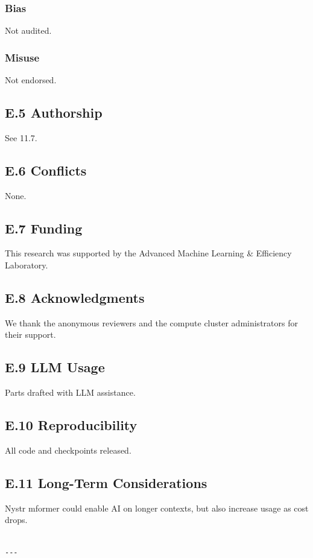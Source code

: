 \subsubsection{Bias}
Not audited.

\subsubsection{Misuse}
Not endorsed.

\subsection{E.5 Authorship}
See  11.7.

\subsection{E.6 Conflicts}
None.

\subsection{E.7 Funding}
This research was supported by the Advanced Machine Learning \& Efficiency Laboratory.

\subsection{E.8 Acknowledgments}
We thank the anonymous reviewers and the compute cluster administrators for their support.

\subsection{E.9 LLM Usage}
Parts drafted with LLM assistance.

\subsection{E.10 Reproducibility}
All code and checkpoints released.

\subsection{E.11 Long-Term Considerations}
Nystr mformer could enable AI on longer contexts, but also increase usage 
as cost drops.
\begin{lstlisting}

---
\end{lstlisting}